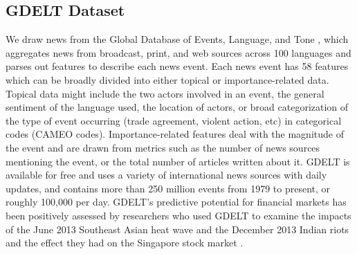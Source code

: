 \subsection{GDELT Dataset}
We draw news from the Global Database of Events, Language, and Tone \cite{GDELT}, which aggregates news from broadcast, print, and web sources across 100 languages and parses out features to describe each news event. Each news event has 58 features which can be broadly divided into either topical or importance-related data. Topical data might include the two actors involved in an event, the general sentiment of the language used, the location of actors, or broad categorization of the type of event occurring (trade agreement, violent action, etc) in categorical codes (CAMEO codes). Importance-related features deal with the magnitude of the event and are drawn from metrics such as the number of news sources mentioning the event, or the total number of articles written about it. GDELT is available for free and uses a variety of international news sources with daily updates, and contains more than 250 million events from 1979 to present, or roughly 100,000 per day. GDELT's predictive potential for financial markets has been positively assessed by researchers who used GDELT to examine the impacts of the June 2013 Southeast Asian heat wave and the December 2013 Indian riots and the effect they had on the Singapore stock market \cite{phua2014visual}.

